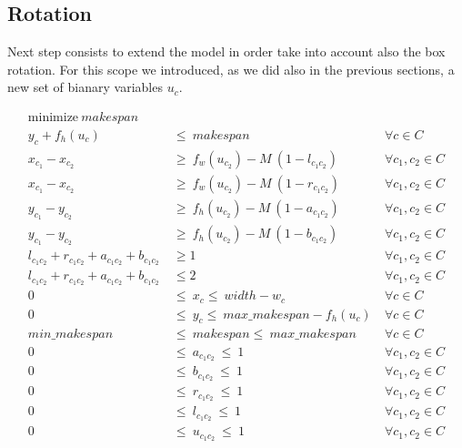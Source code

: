 \subsection{Rotation}
    Next step consists to extend the model in order take into account also the box rotation.
    For this scope we introduced, as we did also in the previous sections, a new set of bianary 
    variables $u_c$. 

    \begin{subequations}
        \label{ilp:rot}
        \begin{align}
        \label{ilp:rot_obj} \text{minimize}\ makespan                                   &\  &\                       \\
        \label{ilp:rot_ycons}  y_c + f_h(u_c)       &\ \leq\ makespan                       &\ \forall c \in C       \\
        \label{ilp:rot_diffn1} x_{c_1} - x_{c_2} &\ \geq\ f_w(u_{c_2}) - M\ (1-l_{c_1c_2})  &\ \forall c_1, c_2 \in C\\ 
        \label{ilp:rot_diffn2} x_{c_1} - x_{c_2} &\ \geq\ f_w(u_{c_2}) - M\ (1-r_{c_1c_2})  &\ \forall c_1, c_2 \in C\\ 
        \label{ilp:rot_diffn3} y_{c_1} - y_{c_2} &\ \geq\ f_h(u_{c_2}) - M\ (1-a_{c_1c_2})  &\ \forall c_1, c_2 \in C\\ 
        \label{ilp:rot_diffn4} y_{c_1} - y_{c_2} &\ \geq\ f_h(u_{c_2}) - M\ (1-b_{c_1c_2})  &\ \forall c_1, c_2 \in C\\ 
        \label{ilp:rot_diffn5} l_{c_1c_2} + r_{c_1c_2} + a_{c_1c_2} + b_{c_1c_2}  &\ \geq 1 &\ \forall c_1, c_2 \in C\\
        \label{ilp:rot_diffn6} l_{c_1c_2} + r_{c_1c_2} + a_{c_1c_2} + b_{c_1c_2}  &\ \leq 2 &\ \forall c_1, c_2 \in C\\
        \label{ilp:rot_b_x} 0                       &\ \leq\ x_c \leq\ width - w_c          &\ \forall c \in C       \\
        \label{ilp:rot_b_y} 0                    &\ \leq\ y_c \leq\ max\_makespan-f_h(u_c)  &\ \forall c \in C       \\
        \label{ilp:rot_b_makspan} min\_makespan     &\ \leq\ makespan \leq\ max\_makespan   &\ \forall c \in C       \\
        \label{ilp:rot_b_a} 0\                      &\ \leq\ a_{c_1c_2}\ \leq\ 1            &\ \forall c_1,c_2 \in C \\
        \label{ilp:rot_b_b} 0\                      &\ \leq\ b_{c_1c_2}\ \leq\ 1            &\ \forall c_1,c_2 \in C \\
        \label{ilp:rot_b_r} 0\                      &\ \leq\ r_{c_1c_2}\ \leq\ 1            &\ \forall c_1,c_2 \in C \\
        \label{ilp:rot_b_l} 0\                      &\ \leq\ l_{c_1c_2}\ \leq\ 1            &\ \forall c_1,c_2 \in C \\
        \label{ilp:rot_b_u} 0\                      &\ \leq\ u_{c_1c_2}\ \leq\ 1            &\ \forall c_1,c_2 \in C
        \end{align}    
    \end{subequations}

